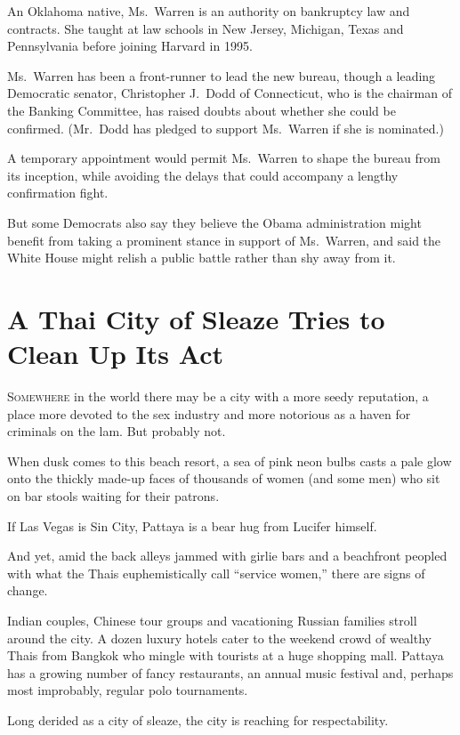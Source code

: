 ﻿\documentclass[12pt]{article}
\begin{document}
An Oklahoma native, Ms.~Warren is an authority on bankruptcy law and contracts. She taught at law
schools in New Jersey, Michigan, Texas and Pennsylvania before joining Harvard in 1995.

Ms.~Warren has been a front-runner to lead the new bureau, though a leading Democratic senator,
Christopher J.~Dodd of Connecticut, who is the chairman of the Banking Committee, has raised doubts
about whether she could be confirmed. (Mr.~Dodd has pledged to support Ms.~Warren if she is
nominated.)

A temporary appointment would permit Ms.~Warren to shape the bureau from its inception, while
avoiding the delays that could accompany a lengthy confirmation fight.

But some Democrats also say they believe the Obama administration might benefit from taking a
prominent stance in support of Ms.~Warren, and said the White House might relish a public battle
rather than shy away from it.

\pagebreak
\section{A Thai City of Sleaze Tries to Clean Up Its Act}

\lettrine{S}{omewhere} in the world there may be a city with a more seedy
reputation, a place more devoted to the sex industry and more notorious as a haven for criminals on
the lam. But probably not.

When dusk comes to this beach resort, a sea of pink neon bulbs casts a pale glow onto the thickly
made-up faces of thousands of women (and some men) who sit on bar stools waiting for their patrons.

If Las Vegas is Sin City, Pattaya is a bear hug from Lucifer himself.

And yet, amid the back alleys jammed with girlie bars and a beachfront peopled with what the Thais
euphemistically call ``service women,'' there are signs of change.

Indian couples, Chinese tour groups and vacationing Russian families stroll around the city. A dozen
luxury hotels cater to the weekend crowd of wealthy Thais from Bangkok who mingle with tourists at a
huge shopping mall. Pattaya has a growing number of fancy restaurants, an annual music festival and,
perhaps most improbably, regular polo tournaments.

Long derided as a city of sleaze, the city is reaching for respectability.
\end{document}
